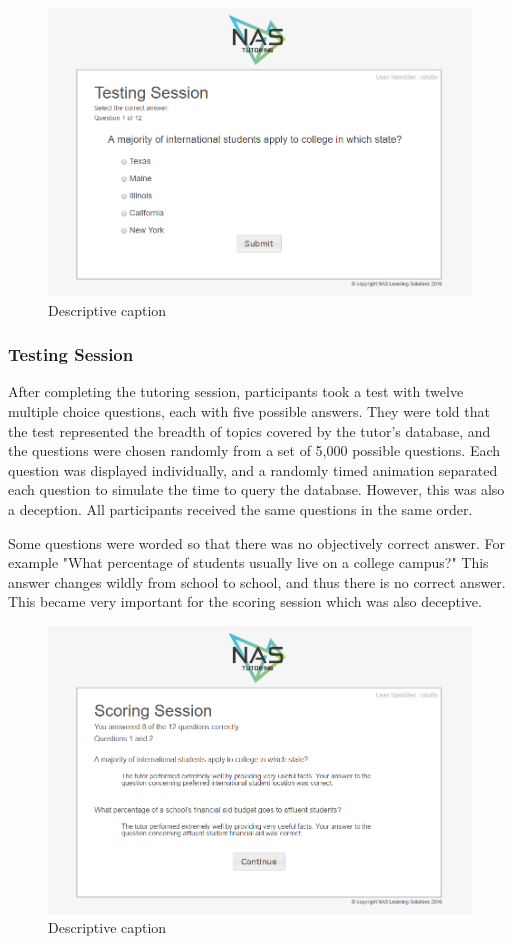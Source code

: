 \documentclass{sig-alternate-05-2015}
\begin{document}
{\begin{figure}[!h]
    \includegraphics[width=\linewidth]{figures/website/06_testing.png}
    \caption{Descriptive caption}
\end{figure}

\subsubsection{Testing Session}
After completing the tutoring session, participants took a test with twelve multiple choice questions, each with five possible answers.  They were told that the test represented the breadth of topics covered by the tutor's database, and the questions were chosen randomly from a set of 5,000 possible questions.   Each question was displayed individually, and a randomly timed animation separated each question to simulate the time to query the database.  However, this was also a deception.  All participants received the same questions in the same order.  

Some questions were worded so that there was no objectively correct answer.  For example "What percentage of students usually live on a college campus?"  This answer changes wildly from school to school, and thus there is no correct answer.  This became very important for the scoring session which was also deceptive.  

\begin{figure}[!h]
    \includegraphics[width=\linewidth]{figures/website/08_scoring.png}
    \caption{Descriptive caption}
\end{figure}

}
\end{document}
